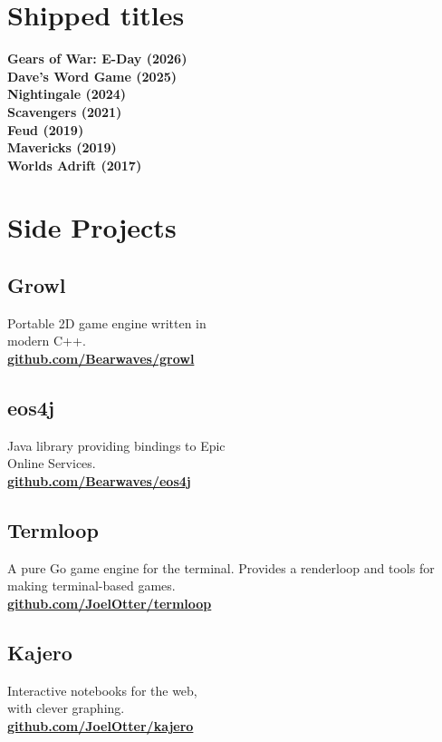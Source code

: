 \documentclass[]{deedy-resume-openfont}
\begin{document}
\begin{minipage}[t]{0.33\textwidth}

\section{Shipped titles}
\bf{Gears of War: E-Day} (2026) \\
\bf{Dave's Word Game} (2025) \\
\bf{Nightingale} (2024) \\
\bf{Scavengers} (2021) \\
\bf{Feud} (2019) \\
\bf{Mavericks} (2019) \\
\bf{Worlds Adrift} (2017) \\
\sectionsep


\section{Side Projects}
\subsection{Growl}
Portable 2D game engine written in\\modern C++.\\
\href{http://github.com/Bearwaves/growl}{\bf{github.com/Bearwaves/growl}}
\sectionsep
\subsection{eos4j}
Java library providing bindings to Epic\\Online Services.\\
\href{http://github.com/Bearwaves/eos4j}{\bf{github.com/Bearwaves/eos4j}}
\sectionsep
\subsection{Termloop}
A pure Go game engine for the terminal. Provides a renderloop and tools for making terminal-based games.\\
\href{http://github.com/JoelOtter/termloop}{\bf{github.com/JoelOtter/termloop}}
\sectionsep
\subsection{Kajero}
Interactive notebooks for the web,\\with clever graphing.\\
\href{http://github.com/JoelOtter/kajero}{\bf{github.com/JoelOtter/kajero}}
\sectionsep

%
%

\end{minipage} 
\end{document}
